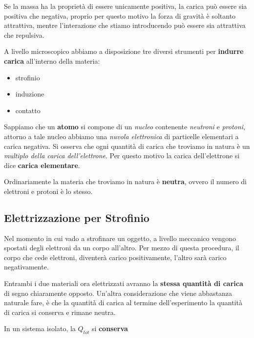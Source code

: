 Se la massa ha la proprietà di essere unicamente positiva, la carica può essere sia positiva che negativa, proprio per questo motivo la forza di gravità è soltanto attrattiva, mentre l'interazione che stiamo introducendo può essere sia attrattiva che repulsiva.

A livello microscopico abbiamo a disposizione tre diversi strumenti per \textbf{indurre carica}  all'interno della materia: 

\begin{itemize}
	\item strofinio
	\item induzione
	\item contatto
\end{itemize}

Sappiamo che un \textbf{atomo} si compone di un \textit{nucleo} contenente \textit{neutroni} e \textit{protoni}, attorno a tale nucleo abbiamo una \textit{nuvola elettronica} di particelle elementari a carica negativa. Si osserva che ogni quantità di carica che troviamo in natura è un \textit{multiplo della carica dell'elettrone}. Per questo motivo la carica dell'elettrone si dice \textbf{carica elementare}.

Ordinariamente la materia che troviamo in natura è \textbf{neutra}, ovvero il numero di elettroni e protoni è lo stesso. 

\subsection{Elettrizzazione per Strofinio}
Nel momento in cui vado a strofinare un oggetto, a livello meccanico vengono spostati degli elettroni da un corpo all'altro. Per mezzo di questa procedura, il corpo che cede elettroni, diventerà carico positivamente, l'altro sarà carico negativamente. 

Entrambi i due materiali ora elettrizzati avranno la \textbf{stessa quantità di carica} di segno chiaramente opposto. Un'altra considerazione che viene abbastanza naturale fare, è che la quantità di carica al termine dell'esperimento la quantità di carica si conserva e rimane neutra.

\medskip


\begin{tcolorbox}
	\begin{center}
				In un sistema isolato, la $Q_{tot}$ si \textbf{conserva}
			\end{center}
\end{tcolorbox}



